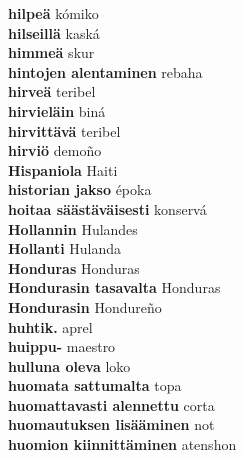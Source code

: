 \textbf{ hilpeä  } kómiko \\
\textbf{ hilseillä  } kaská \\
\textbf{ himmeä  } skur \\
\textbf{ hintojen alentaminen  } rebaha \\
\textbf{ hirveä  } teribel \\
\textbf{ hirvieläin  } biná \\
\textbf{ hirvittävä  } teribel \\
\textbf{ hirviö  } demoño \\
\textbf{ Hispaniola  } Haiti \\
\textbf{ historian jakso  } époka \\
\textbf{ hoitaa säästäväisesti  } konservá \\
\textbf{ Hollannin  } Hulandes \\
\textbf{ Hollanti  } Hulanda \\
\textbf{ Honduras  } Honduras \\
\textbf{ Hondurasin tasavalta  } Honduras \\
\textbf{ Hondurasin  } Hondureño \\
\textbf{ huhtik.  } aprel \\
\textbf{ huippu-  } maestro \\
\textbf{ hulluna oleva  } loko \\
\textbf{ huomata sattumalta  } topa \\
\textbf{ huomattavasti alennettu  } corta \\
\textbf{ huomautuksen lisääminen  } not \\
\textbf{ huomion kiinnittäminen  } atenshon \\
